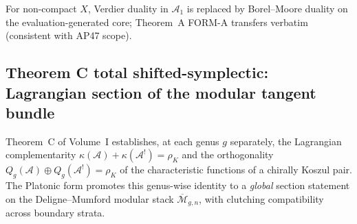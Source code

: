 \documentclass[11pt]{article}
\begin{document}
\begin{remark}
For non-compact $X$, Verdier duality in $\mathcal{A}_1$ is replaced
by Borel--Moore duality on the evaluation-generated core; Theorem~A
FORM-A transfers verbatim (consistent with AP47 scope).
\end{remark}

\subsection{Theorem C total shifted-symplectic: Lagrangian section of the modular tangent bundle}
\label{subsec:theoremC-total-shifted-symplectic}

Theorem~C of Volume~I establishes, at each genus $g$ separately,
the Lagrangian complementarity
$\kappa(\mathcal{A}) + \kappa(\mathcal{A}^!) = \rho_K$ and the
orthogonality $Q_g(\mathcal{A}) \oplus Q_g(\mathcal{A}^!) = \rho_K$
of the characteristic functions of a chirally Koszul pair. The
Platonic form promotes this genus-wise identity to a \emph{global}
section statement on the Deligne--Mumford modular stack
$\overline{\mathcal{M}}_{g,n}$, with clutching compatibility
across boundary strata.
\end{document}
